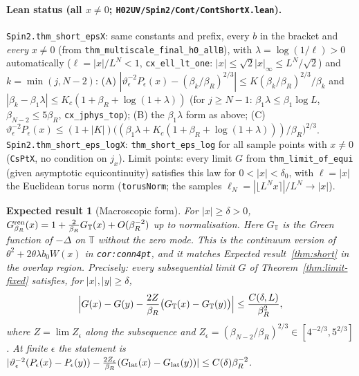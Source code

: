 \documentclass[11pt]{amsart}
\newtheorem{conjecture}[theorem]{Expected result}
\theoremstyle{definition}
\theoremstyle{remark}
\numberwithin{equation}{section}
\newcommand{\T}{\mathbb{T}}
\begin{document}
\paragraph{Lean status (all $x\ne0$; \texttt{H02UV/Spin2/Cont/ContShortX.lean}).} \texttt{Spin2.thm\_short\_epsX}: same constants
and prefix, every $b$ in the bracket and \emph{every} $x\ne0$ (from \texttt{thm\_multiscale\_final\_h0\_allB}), with
$\lambda=\log(1/\ell)>0$ automatically ($\ell=|x|/L^N<1$, \texttt{cx\_ell\_lt\_one}: $|x|\le\sqrt2|x|_\infty\le L^N/\sqrt2$) and
$k=\min(j,N-2)$: (A) $|\vartheta_\epsilon^{-2}P_\epsilon(x)-(\beta_k/\beta_R)^{2/3}|\le K(\beta_k/\beta_R)^{2/3}/\beta_k$ and
$|\beta_k-\beta_1\lambda|\le K_c(1+\beta_R+\log(1+\lambda))$ (for $j\ge N-1$: $\beta_1\lambda\le\beta_1\log L$,
$\beta_{N-2}\le5\beta_R$, \texttt{cx\_jphys\_top}); (B) the $\beta_1\lambda$ form as above; (C)
$\vartheta_\epsilon^{-2}P_\epsilon(x)\le(1+|K|)\bigl((\beta_1\lambda+K_c(1+\beta_R+\log(1+\lambda)))/\beta_R\bigr)^{2/3}$.
\texttt{Spin2.thm\_short\_eps\_logX}: \texttt{thm\_short\_eps\_log} for all sample points with $x\ne0$ (\texttt{CsPtX}, no
condition on $j_x$). Limit points: every limit $G$ from \texttt{thm\_limit\_of\_equi} (given asymptotic equicontinuity) satisfies this law for
$0<|x|<\delta_0$, with $\ell=|x|$ the Euclidean torus norm (\texttt{torusNorm}; the samples $\ell_N=|\lfloor L^Nx\rceil|/L^N\to|x|$).

\begin{conjecture}[Macroscopic form]\label{thm:macro}
For $|x|\ge\delta>0$,
$G^{\rm ren}_{\beta_R}(x)=1+\frac2{\beta_R}G_\T(x)+O(\beta_R^{-2})$ up to normalisation. Here
$G_\T$ is the Green function of $-\Delta$ on $\T$ without the zero mode. This is the
continuum version of $\theta^2+2\theta\lambda b_0W(x)$ in \texttt{cor:conn4pt}, and it matches
Expected result~\ref{thm:short} in the overlap region. Precisely: every subsequential limit $G$ of
Theorem~\ref{thm:limit-fixed} satisfies, for $|x|,|y|\ge\delta$,
\[
  \Bigl|G(x)-G(y)-\frac{2Z}{\beta_R}\bigl(G_\T(x)-G_\T(y)\bigr)\Bigr|\le\frac{C(\delta,L)}{\beta_R^2},
\]
where $Z=\lim Z_\epsilon$ along the subsequence and $Z_\epsilon=(\beta_{N-2}/\beta_R)^{2/3}\in[4^{-2/3},5^{2/3}]$.
At finite $\epsilon$ the statement is
$|\vartheta_\epsilon^{-2}(P_\epsilon(x)-P_\epsilon(y))-\frac{2Z_\epsilon}{\beta_R}(G_{\rm lat}(x)-G_{\rm lat}(y))|\le C(\delta)\beta_R^{-2}$.
\end{conjecture}
\end{document}

